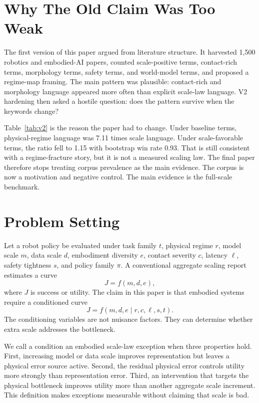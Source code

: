 \documentclass{article}
\begin{document}
\section{Why The Old Claim Was Too Weak}

The first version of this paper argued from literature structure. It harvested 1,500 robotics and embodied-AI papers, counted scale-positive terms, contact-rich terms, morphology terms, safety terms, and world-model terms, and proposed a regime-map framing. The main pattern was plausible: contact-rich and morphology language appeared more often than explicit scale-law language. V2 hardening then asked a hostile question: does the pattern survive when the keywords change?

\begin{table}[t]
\centering
\small
\resizebox{\linewidth}{!}{}
\caption{V2 corpus-sensitivity audit. The field-map signal survives, but the exact ratio changes enough that keyword counts cannot support a final scaling-law claim.}
\label{tab:v2}
\end{table}

Table~\ref{tab:v2} is the reason the paper had to change. Under baseline terms, physical-regime language was 7.11 times scale language. Under scale-favorable terms, the ratio fell to 1.15 with bootstrap win rate 0.93. That is still consistent with a regime-fracture story, but it is not a measured scaling law. The final paper therefore stops treating corpus prevalence as the main evidence. The corpus is now a motivation and negative control. The main evidence is the full-scale benchmark.

\section{Problem Setting}

Let a robot policy be evaluated under task family $t$, physical regime $r$, model scale $m$, data scale $d$, embodiment diversity $e$, contact severity $c$, latency $\ell$, safety tightness $s$, and policy family $\pi$. A conventional aggregate scaling report estimates a curve
\[
    J = f(m,d,e),
\]
where $J$ is success or utility. The claim in this paper is that embodied systems require a conditioned curve
\[
    J = f(m,d,e \mid r,c,\ell,s,t).
\]
The conditioning variables are not nuisance factors. They can determine whether extra scale addresses the bottleneck.

We call a condition an embodied scale-law exception when three properties hold. First, increasing model or data scale improves representation but leaves a physical error source active. Second, the residual physical error controls utility more strongly than representation error. Third, an intervention that targets the physical bottleneck improves utility more than another aggregate scale increment. This definition makes exceptions measurable without claiming that scale is bad.
\end{document}
